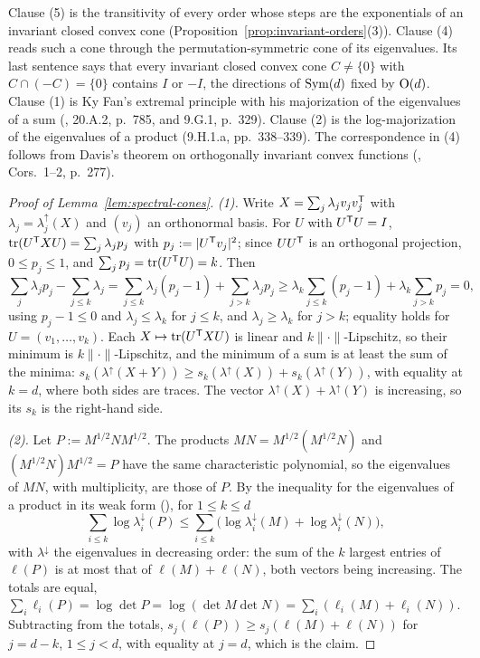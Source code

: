 Clause (5) is the transitivity of every order whose steps are the exponentials of an invariant closed
convex cone (Proposition~\ref{prop:invariant-orders}(3)). Clause (4) reads such a cone through the
permutation-symmetric cone of its eigenvalues. Its last sentence says that every invariant closed
convex cone $C \ne \{0\}$ with $C \cap (-C) = \{0\}$ contains $I$ or $-I$, the directions of
$\mathrm{Sym}(d)$ fixed by $\mathrm{O}(d)$. Clause (1) is Ky Fan's extremal principle with his majorization of
the eigenvalues of a sum (, 20.A.2, p.~785, and 9.G.1, p.~329).
Clause (2) is the log-majorization of the eigenvalues of a product (9.H.1.a, pp.~338--339). The
correspondence in (4) follows from Davis's theorem on orthogonally invariant convex functions
(, Cors.~1--2, p.~277).

\begin{proof}[Proof of Lemma~\ref{lem:spectral-cones}]
\emph{(1).} Write $X = \sum_j\lambda_jv_jv_j^{\mathsf{T}}$ with $\lambda_j = \lambda^\uparrow_j(X)$ and $(v_j)$ an
orthonormal basis. For $U$ with $U^{\mathsf{T}}U = I$, $\operatorname{tr}(U^{\mathsf{T}}XU) = \sum_j\lambda_jp_j$ with
$p_j := |U^{\mathsf{T}}v_j|^2$; since $UU^{\mathsf{T}}$ is an orthogonal projection, $0 \le p_j \le 1$, and
$\sum_jp_j = \operatorname{tr}(U^{\mathsf{T}}U) = k$. Then
\[
  \sum_j\lambda_jp_j - \sum_{j\le k}\lambda_j = \sum_{j\le k}\lambda_j(p_j - 1) + \sum_{j>k}\lambda_jp_j
  \ge \lambda_k\sum_{j\le k}(p_j - 1) + \lambda_k\sum_{j>k}p_j = 0 ,
\]
using $p_j - 1 \le 0$ and $\lambda_j \le \lambda_k$ for $j \le k$, and $\lambda_j \ge \lambda_k$ for
$j > k$; equality holds for $U = (v_1, \dots, v_k)$. Each $X \mapsto \operatorname{tr}(U^{\mathsf{T}}XU)$ is linear and
$k\|\cdot\|$-Lipschitz, so their minimum is $k\|\cdot\|$-Lipschitz, and the minimum of a sum is at least
the sum of the minima: $s_k(\lambda^\uparrow(X+Y)) \ge s_k(\lambda^\uparrow(X)) +
s_k(\lambda^\uparrow(Y))$, with equality at $k = d$, where both sides are traces. The vector
$\lambda^\uparrow(X) + \lambda^\uparrow(Y)$ is increasing, so its $s_k$ is the right-hand side.

\emph{(2).} Let $P := M^{1/2}NM^{1/2}$. The products $MN = M^{1/2}(M^{1/2}N)$ and $(M^{1/2}N)M^{1/2} = P$
have the same characteristic polynomial, so the eigenvalues of $MN$, with multiplicity, are those of $P$.
By the inequality for the eigenvalues of a product in its weak form (), for $1 \le k \le d$
\[
  \sum_{i\le k}\log\lambda^\downarrow_i(P) \le \sum_{i\le k}\bigl(\log\lambda^\downarrow_i(M) +
  \log\lambda^\downarrow_i(N)\bigr) ,
\]
with $\lambda^\downarrow$ the eigenvalues in decreasing order: the sum of the $k$ largest entries of
$\ell(P)$ is at most that of $\ell(M) + \ell(N)$, both vectors being increasing. The totals are equal,
$\sum_i\ell_i(P) = \log\det P = \log(\det M\det N) = \sum_i(\ell_i(M) + \ell_i(N))$. Subtracting from the
totals, $s_j(\ell(P)) \ge s_j(\ell(M) + \ell(N))$ for $j = d - k$, $1 \le j < d$, with equality at $j = d$,
which is the claim.


\end{proof}
